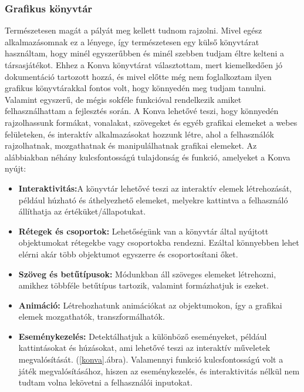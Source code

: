 \documentclass[a4paper,twoside]{article}
\begin{document}
\subsubsection{Grafikus könyvtár}
Természetesen magát a pályát meg kellett tudnom rajzolni. Mivel egész alkalmazásomnak ez a lényege, így természetesen egy külső könyvtárat használtam, hogy minél egyszerűbben és minél szebben tudjam éltre kelteni a társasjátékot. Ehhez a Konva\cite{konva} könyvtárat választottam, mert kiemelkedően jó dokumentáció tartozott hozzá, és mivel előtte még nem foglalkoztam ilyen grafikus könyvtárakkal fontos volt, hogy könnyedén meg tudjam tanulni. Valamint egyszerű, de mégis sokféle funkcióval rendelkezik amiket felhasználhattam a fejlesztés során. 
A Konva lehetővé teszi, hogy könnyedén rajzolhassunk formákat, vonalakat, szövegeket és egyéb grafikai elemeket a webes felületeken, és interaktív alkalmazásokat hozzunk létre, ahol a felhasználók rajzolhatnak, mozgathatnak és manipulálhatnak grafikai elemeket. Az alábbiakban néhány kulcsfontosságú tulajdonság és funkció, amelyeket a Konva nyújt:
\begin{itemize}
	\item \textbf{Interaktivitás:}A könyvtár lehetővé teszi az interaktív elemek létrehozását, például húzható és áthelyezhető elemeket, melyekre kattintva a felhasználó állíthatja az értéküket/állapotukat. 
	\item \textbf{Rétegek és csoportok:} Lehetőségünk van a könyvtár által nyújtott objektumokat rétegekbe vagy csoportokba rendezni. Ezáltal könnyebben lehet elérni akár több objektumot egyszerre és csoportosítani őket.
	\item \textbf{Szöveg és betűtípusok:} Módunkban áll szöveges elemeket létrehozni, amikhez többféle betűtípus tartozik, valamint formázhatjuk is ezeket. 
	\item \textbf{Animáció:} Létrehozhatunk animációkat az objektumokon, így a grafikai elemek mozgathatók, transzformálhatók.
	\item \textbf{Eseménykezelés:} Detektálhatjuk a különböző eseményeket, például kattintásokat és húzásokat, ami lehetővé teszi az interaktív műveletek megvalósítását. (\ref{konva}.ábra).
	Valamennyi funkció kulcsfontosságú volt a játék megvalósításához, hiszen az eseménykezelés, és interaktivitás nélkül nem tudtam volna lekövetni a felhasználói inputokat.  
\end{itemize}
\end{document}
